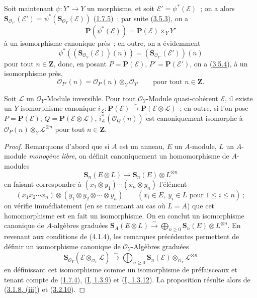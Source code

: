 \begin{env}[4.1.3]
\label{II.4.1.3-fr}
Soit maintenant $\psi:Y'\to Y$ un morphisme, et soit
$\mathcal{E}'=\psi^*(\mathcal{E})$~; on a alors
$\mathbf{S}_{\mathcal{O}_{Y'}}(\mathcal{E}')=
\psi^*(\mathbf{S}_{\mathcal{O}_Y}(\mathcal{E}))$
(\hyperref[II.1.7.5-fr]{1.7.5})~; par suite
(\hyperref[II.3.5.3-fr]{3.5.3}), on a
\[
\label{II.4.1.3.1-fr}
  \mathbf{P}(\psi^*(\mathcal{E}))=
  \mathbf{P}(\mathcal{E})\times_YY'
\tag{4.1.3.1}
\]
à un isomorphisme canonique près~; en outre, on a évidemment
\[
  \psi^*((\mathbf{S}_{\mathcal{O}_Y}(\mathcal{E}))(n))
  =(\mathbf{S}_{\mathcal{O}_{Y'}}(\mathcal{E}'))(n)
\]
pour tout $n\in\mathbf{Z}$, donc, en posant $P=\mathbf{P}(\mathcal{E})$,
$P'=\mathbf{P}(\mathcal{E}')$, on a
(\hyperref[II.3.5.4-fr]{3.5.4}), à un isomorphisme près,
\[
\label{II.4.1.3.2-fr}
  \mathcal{O}_{P'}(n)=\mathcal{O}_P(n)\otimes_Y\mathcal{O}_{Y'}
  \qquad\text{pour tout }n\in\mathbf{Z}.
\tag{4.1.3.2}
\]
\end{env}


\begin{proposition}[4.1.4]
\label{II.4.1.4-fr}
Soit $\mathcal{L}$ un $\mathcal{O}_Y$-Module inversible. Pour tout
$\mathcal{O}_Y$-Module quasi-cohérent $\mathcal{E}$, il existe un
$Y$-isomorphisme canonique
$i_{\mathcal{L}}:\mathbf{P}(\mathcal{E})\xrightarrow{\sim}
\mathbf{P}(\mathcal{E}\otimes\mathcal{L})$~; en outre, si l'on pose
$P=\mathbf{P}(\mathcal{E})$, $Q=\mathbf{P}(\mathcal{E}\otimes\mathcal{L})$,
$i_{\mathcal{L}}^*(\mathcal{O}_Q(n))$ est canoniquement isomorphe à
$\mathcal{O}_P(n)\otimes_Y\mathcal{L}^{\otimes n}$ pour tout
$n\in\mathbf{Z}$.
\end{proposition}

\begin{proof}
Remarquons d'abord que si $A$ est un anneau, $E$ un $A$-module, $L$ un
$A$-module \emph{monogène libre}, on définit canoniquement un homomorphisme
de $A$-modules
\[
  \mathbf{S}_n(E\otimes L)\longrightarrow
  \mathbf{S}_n(E)\otimes L^{\otimes n}
\]
en faisant correspondre à
$(x_1\otimes y_1)\cdots(x_n\otimes y_n)$ l'élément
\[
  (x_1x_2\cdots x_n)\otimes(y_1\otimes y_2\otimes\cdots\otimes y_n)
  \qquad(x_i\in E,\ y_i\in L\text{ pour }1\leq i\leq n)~;
\]
on vérifie immédiatement (en se ramenant au cas où $L=A$) que cet
homomorphisme est en fait un isomorphisme. On en conclut un isomorphisme
canonique de $A$-algèbres graduées
$\mathbf{S}_A(E\otimes L)\xrightarrow{\sim}
\bigoplus_{n\geq0}\mathbf{S}_n(E)\otimes L^{\otimes n}$. En revenant aux
conditions de (4.1.4), les remarques précédentes permettent de définir un
isomorphisme canonique de $\mathcal{O}_Y$-Algèbres graduées
\[
\label{II.4.1.4.1-fr}
  \mathbf{S}_{\mathcal{O}_Y}(\mathcal{E}\otimes_{\mathcal{O}_Y}\mathcal{L})
  \xrightarrow{\sim}
  \bigoplus_{n\geq0}\mathbf{S}_n(\mathcal{E})
  \otimes_{\mathcal{O}_Y}\mathcal{L}^{\otimes n}
\tag{4.1.4.1}
\]
en définissant cet isomorphisme comme un isomorphisme de préfaisceaux et
tenant compte de (\hyperref[II.1.7.4-fr]{1.7.4}),
(\hyperref[I.1.3.9-fr]{I, 1.3.9}) et
(\hyperref[I.1.3.12-fr]{I, 1.3.12}). La proposition résulte alors de
(\hyperref[II.3.1.8-fr]{3.1.8, (iii)}) et
(\hyperref[II.3.2.10-fr]{3.2.10}).
\end{proof}

